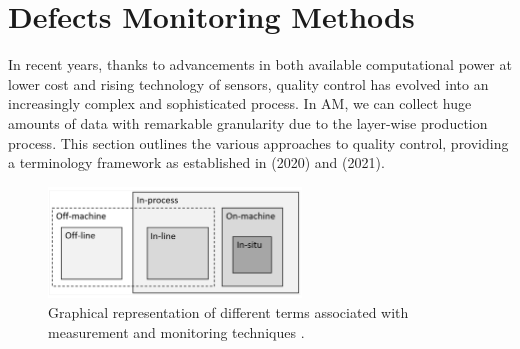 
\section{Defects Monitoring Methods}
\label{sec:monitoringdefect}
In recent years, thanks to advancements in both available computational power at lower cost and rising technology of sensors, quality control has evolved into an increasingly complex and sophisticated process. In AM, we can collect huge amounts of data with remarkable granularity due to the layer-wise production process. This section outlines the various approaches to quality control, providing a terminology framework as established in \citeauthor{richard_leach_integrated_2020} (2020) and \citeauthor{grasso_-situ_2021} (2021).
\begin{figure}
    \centering
    \includegraphics[width=0.6\textwidth]{Images/qcframework.png}
    \caption[Measurement and monitoring techniques.]{Graphical representation of different terms associated with measurement and monitoring techniques \cite{richard_leach_integrated_2020}.}
\end{figure}
